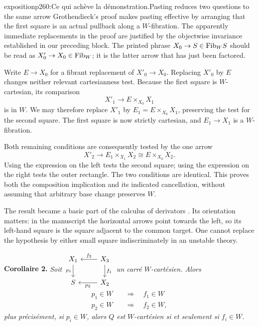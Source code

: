 \begin{dcomment}{exposition}{p260:Ce qui achève la démonstration.}{Pasting reduces two questions to the same arrow}
Grothendieck's proof makes pasting effective by arranging that the first square is an actual pullback along a $W$-fibration. The apparently immediate replacements in the proof are justified by the objectwise invariance established in our preceding block. The printed phrase $X_0\to S\in\mathrm{Fib}_W S$ should be read as $X'_0\to X_0\in\mathrm{Fib}_W$; it is the latter arrow that has just been factored.

Write $E\to X_0$ for a fibrant replacement of $X'_0\to X_0$. Replacing $X'_0$ by $E$ changes neither relevant cartesianness test. Because the first square is $W$-cartesian, its comparison
\[
 X'_1\longrightarrow E\times_{X_0}X_1
\]
is in $W$. We may therefore replace $X'_1$ by $E_1=E\times_{X_0}X_1$, preserving the test for the second square. The first square is now strictly cartesian, and $E_1\to X_1$ is a $W$-fibration.

Both remaining conditions are consequently tested by the one arrow
\[
 X'_2\longrightarrow E_1\times_{X_1}X_2
       \cong E\times_{X_0}X_2.
\]
Using the expression on the left tests the second square; using the expression on the right tests the outer rectangle. The two conditions are identical. This proves both the composition implication and its indicated cancellation, without assuming that arbitrary base change preserves $W$.

The result became a basic part of the calculus of derivators \citep[Proposition 3.13]{Groth2013}. Its orientation matters: in the manuscript the horizontal arrows point towards the left, so its left-hand square is the square adjacent to the common target. One cannot replace the hypothesis by either small square indiscriminately in an unstable theory.
\end{dcomment}


\textbf{Corollaire 2.} \textit{Soit $\begin{tikzcd}[ampersand replacement=\&] X_1 \arrow[d, "p_1"'] \& X_3 \arrow[l, "f_2"'] \arrow[d, "f_1"] \\ S \& X_2 \arrow[l, "p_2"] \end{tikzcd}$ un carré $W$-cartésien. Alors}
\[
\begin{aligned}
p_1\in W\quad&\Longrightarrow\quad f_1\in W\\
p_2\in W\quad&\Longrightarrow\quad f_2\in W,
\end{aligned}
\]
\textit{plus précisément, si $p_i\in W$, alors $Q$ est $W$-cartésien si et seulement si $f_i\in W$.}

